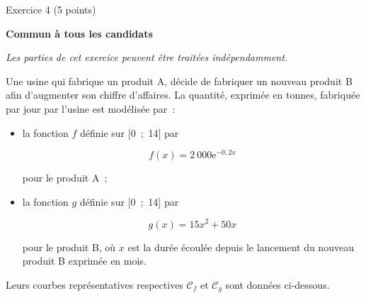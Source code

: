 
%
\begin{h2}Exercice 4 (5 points)\end{h2}
\textbf{Commun à  tous les candidats}
\par
\begin{center}
     \textit{ Les parties de cet exercice peuvent être traitées indépendamment.}
\end{center}
\par
Une usine qui fabrique un produit A, décide de fabriquer un nouveau produit B afin d'augmenter son chiffre d'affaires. La quantité, exprimée en tonnes, fabriquée par jour par l'usine est modélisée par~:
\begin{itemize}
     \item la fonction $f$ définie sur [0~;~14] par
     \par
     \[f(x) = 2~000\text{e}^{-0,2x}\]
     \par
     pour le produit A~;
     \item  la fonction $g$ définie sur [0~;~14] par
     \par
     \[g (x)= 15x^2 + 50 x\]
     \par
     pour le produit B, où $x$ est la durée écoulée depuis le lancement du nouveau produit B exprimée en mois.
\end{itemize}
Leurs courbes représentatives respectives $\mathscr{C}_f$ et $\mathscr{C}_g$ sont données ci-dessous.
\begin{center}
     \begin{extern}%
     \end{extern}
\end{center}

